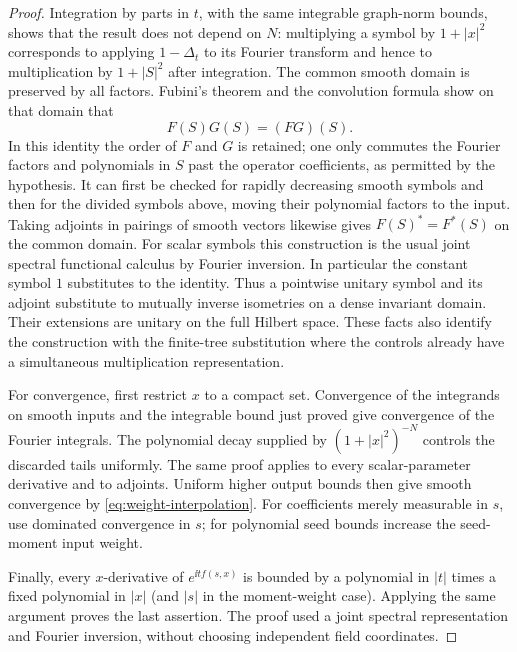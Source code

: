 \begin{proof}
Integration by parts in $t$, with the same integrable graph-norm
bounds, shows that the result does not depend on $N$: multiplying
a symbol by $1+|x|^2$ corresponds to applying $1-\Delta_t$ to
its Fourier transform and hence to multiplication by
$1+|S|^2$ after integration.  The common smooth domain is
preserved by all factors.  Fubini's theorem and the convolution
formula show on that domain that
\[
              F(S)G(S)=(FG)(S).
\]
In this identity the order of $F$ and $G$ is retained; one only
commutes the Fourier factors and polynomials in $S$ past the
operator coefficients, as permitted by the hypothesis.  It can
first be checked for rapidly decreasing smooth symbols and
then for the divided symbols above, moving their polynomial
factors to the input.  Taking adjoints in pairings of smooth
vectors likewise gives $F(S)^*=F^*(S)$ on the common domain.
For scalar symbols this construction is the usual joint
spectral functional calculus by Fourier inversion.  In
particular the constant symbol $1$ substitutes to the identity.
Thus a pointwise unitary symbol and its adjoint substitute to
mutually inverse isometries on a dense invariant domain.  Their
extensions are unitary on the full Hilbert space.  These facts
also identify the construction with the finite-tree substitution
where the controls already have a simultaneous multiplication
representation.

For convergence, first restrict $x$ to a compact set.  Convergence
of the integrands on smooth inputs and the integrable bound just
proved give convergence of the Fourier integrals.  The polynomial
decay supplied by $(1+|x|^2)^{-N}$ controls the discarded tails
uniformly.  The same proof applies to every scalar-parameter
derivative and to adjoints.  Uniform higher output bounds then
give smooth convergence by \eqref{eq:weight-interpolation}.
For coefficients merely measurable in $s$, use dominated
convergence in $s$; for polynomial seed bounds increase the
seed-moment input weight.

Finally, every $x$-derivative of $e^{\ii t f(s,x)}$ is bounded
by a polynomial in $|t|$ times a fixed polynomial in $|x|$
(and $|s|$ in the moment-weight case).  Applying the same
argument proves the last assertion.  The proof used a joint
spectral representation and Fourier inversion, without choosing
independent field coordinates.
\end{proof}

